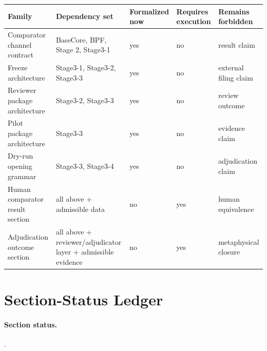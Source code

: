 \documentclass[11pt]{article}
\newcommand{\sectionstatus}[1]{\paragraph{Section status.}\texttt{\detokenize{#1}}.}
\begin{document}
\begin{table}[h]
\centering
\small
\begin{tabular}{L{0.22\textwidth}L{0.21\textwidth}L{0.19\textwidth}L{0.18\textwidth}L{0.12\textwidth}}
\toprule
Family & Dependency set & Formalized now & Requires execution & Remains forbidden \\
\midrule
Comparator channel contract & BaseCore, BPF, Stage 2, Stage3-1 & yes & no & result claim \\
Freeze architecture & Stage3-1, Stage3-2, Stage3-3 & yes & no & external filing claim \\
Reviewer package architecture & Stage3-2, Stage3-3 & yes & no & review outcome \\
Pilot package architecture & Stage3-3 & yes & no & evidence claim \\
Dry-run opening grammar & Stage3-3, Stage3-4 & yes & no & adjudication claim \\
Human comparator result section & all above + admissible data & no & yes & human equivalence \\
Adjudication outcome section & all above + reviewer/adjudicator layer + admissible evidence & no & yes & metaphysical closure \\
\bottomrule
\end{tabular}
\end{table}

\section{Section-Status Ledger}
\sectionstatus{formalized}
\end{document}
